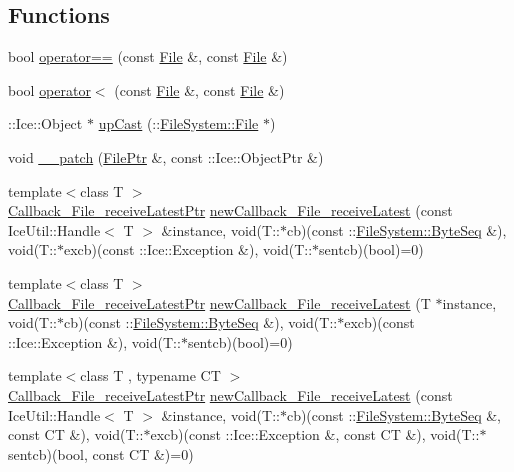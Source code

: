 \subsection*{Functions}
\begin{DoxyCompactItemize}
\item 
bool \hyperlink{namespace_file_system_a73ba38c87f762f68818866f670cdece9}{operator==} (const \hyperlink{class_file_system_1_1_file}{File} \&, const \hyperlink{class_file_system_1_1_file}{File} \&)
\item 
bool \hyperlink{namespace_file_system_ace2c44fa41a64ff7b2d5262d77563c06}{operator$<$} (const \hyperlink{class_file_system_1_1_file}{File} \&, const \hyperlink{class_file_system_1_1_file}{File} \&)
\item 
\+::Ice\+::\+Object $\ast$ \hyperlink{namespace_file_system_a918f916e3b881056468148cf34e98734}{up\+Cast} (\+::\hyperlink{class_file_system_1_1_file}{File\+System\+::\+File} $\ast$)
\item 
void \hyperlink{namespace_file_system_a51d618729b59cf8ad7823ff14af488de}{\+\_\+\+\_\+patch} (\hyperlink{namespace_file_system_a322304ec4ae6dc6308f79d49662764bb}{File\+Ptr} \&, const \+::Ice\+::\+Object\+Ptr \&)
\item 
{\footnotesize template$<$class T $>$ }\\\hyperlink{namespace_file_system_a86fe38e325e02ddd26f665f486d51837}{Callback\+\_\+\+File\+\_\+receive\+Latest\+Ptr} \hyperlink{namespace_file_system_a8cc04448ea3637125a33672fbd8f01db}{new\+Callback\+\_\+\+File\+\_\+receive\+Latest} (const Ice\+Util\+::\+Handle$<$ T $>$ \&instance, void(T\+::$\ast$cb)(const \+::\hyperlink{namespace_file_system_a5c85de065f9c451ae1d1dea2dacb68c5}{File\+System\+::\+Byte\+Seq} \&), void(T\+::$\ast$excb)(const \+::Ice\+::\+Exception \&), void(T\+::$\ast$sentcb)(bool)=0)
\item 
{\footnotesize template$<$class T $>$ }\\\hyperlink{namespace_file_system_a86fe38e325e02ddd26f665f486d51837}{Callback\+\_\+\+File\+\_\+receive\+Latest\+Ptr} \hyperlink{namespace_file_system_a4fbffcbd3a07944195f823e591bb353d}{new\+Callback\+\_\+\+File\+\_\+receive\+Latest} (T $\ast$instance, void(T\+::$\ast$cb)(const \+::\hyperlink{namespace_file_system_a5c85de065f9c451ae1d1dea2dacb68c5}{File\+System\+::\+Byte\+Seq} \&), void(T\+::$\ast$excb)(const \+::Ice\+::\+Exception \&), void(T\+::$\ast$sentcb)(bool)=0)
\item 
{\footnotesize template$<$class T , typename C\+T $>$ }\\\hyperlink{namespace_file_system_a86fe38e325e02ddd26f665f486d51837}{Callback\+\_\+\+File\+\_\+receive\+Latest\+Ptr} \hyperlink{namespace_file_system_a0046b7a52a5238cb4aec849e4ccd3f15}{new\+Callback\+\_\+\+File\+\_\+receive\+Latest} (const Ice\+Util\+::\+Handle$<$ T $>$ \&instance, void(T\+::$\ast$cb)(const \+::\hyperlink{namespace_file_system_a5c85de065f9c451ae1d1dea2dacb68c5}{File\+System\+::\+Byte\+Seq} \&, const C\+T \&), void(T\+::$\ast$excb)(const \+::Ice\+::\+Exception \&, const C\+T \&), void(T\+::$\ast$sentcb)(bool, const C\+T \&)=0)

\end{DoxyCompactItemize}
